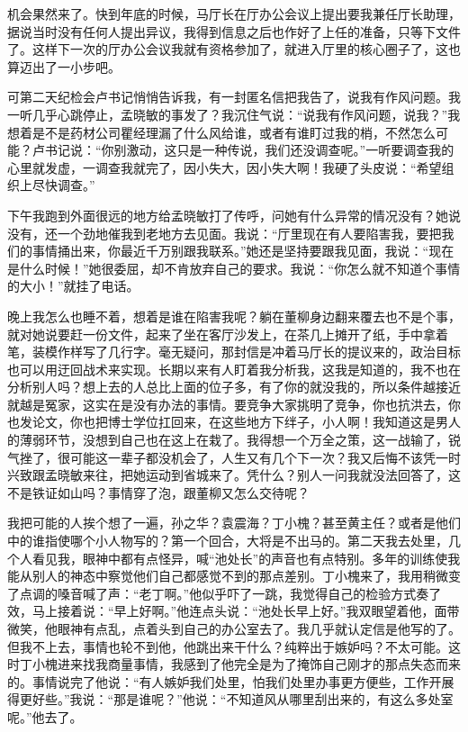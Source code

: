 \documentclass[12pt,oneside]{book}
\begin{document}
机会果然来了。快到年底的时候，马厅长在厅办公会议上提出要我兼任厅长助理，据说当时没有任何人提出异议，我得到信息之后也作好了上任的准备，只等下文件了。这样下一次的厅办公会议我就有资格参加了，就进入厅里的核心圈子了，这也算迈出了一小步吧。

可第二天纪检会卢书记悄悄告诉我，有一封匿名信把我告了，说我有作风问题。我一听几乎心跳停止，孟晓敏的事发了？我沉住气说：``说我有作风问题，说我？''我想着是不是药材公司瞿经理漏了什么风给谁，或者有谁盯过我的梢，不然怎么可能？卢书记说：``你别激动，这只是一种传说，我们还没调查呢。''一听要调查我的心里就发虚，一调查我就完了，因小失大，因小失大啊！我硬了头皮说：``希望组织上尽快调查。''

下午我跑到外面很远的地方给孟晓敏打了传呼，问她有什么异常的情况没有？她说没有，还一个劲地催我到老地方去见面。我说：``厅里现在有人要陷害我，要把我们的事情捅出来，你最近千万别跟我联系。''她还是坚持要跟我见面，我说：``现在是什么时候！''她很委屈，却不肯放弃自己的要求。我说：``你怎么就不知道个事情的大小！''就挂了电话。

晚上我怎么也睡不着，想着是谁在陷害我呢？躺在董柳身边翻来覆去也不是个事，就对她说要赶一份文件，起来了坐在客厅沙发上，在茶几上摊开了纸，手中拿着笔，装模作样写了几行字。毫无疑问，那封信是冲着马厅长的提议来的，政治目标也可以用迂回战术来实现。长期以来有人盯着我分析我，这我是知道的，我不也在分析别人吗？想上去的人总比上面的位子多，有了你的就没我的，所以条件越接近就越是冤家，这实在是没有办法的事情。要竞争大家挑明了竞争，你也抗洪去，你也发论文，你也把博士学位扛回来，在这些地方下绊子，小人啊！我知道这是男人的薄弱环节，没想到自己也在这上在栽了。我得想一个万全之策，这一战输了，锐气挫了，很可能这一辈子都没机会了，人生又有几个下一次？我又后悔不该凭一时兴致跟孟晓敏来往，把她运动到省城来了。凭什么？别人一问我就没法回答了，这不是铁证如山吗？事情穿了泡，跟董柳又怎么交待呢？

我把可能的人挨个想了一遍，孙之华？袁震海？丁小槐？甚至黄主任？或者是他们中的谁指使哪个小人物写的？第一个回合，大将是不出马的。第二天我去处里，几个人看见我，眼神中都有点怪异，喊``池处长''的声音也有点特别。多年的训练使我能从别人的神态中察觉他们自己都感觉不到的那点差别。丁小槐来了，我用稍微变了点调的嗓音喊了声：``老丁啊。''他似乎吓了一跳，我觉得自己的检验方式奏了效，马上接着说：``早上好啊。''他连点头说：``池处长早上好。''我双眼望着他，面带微笑，他眼神有点乱，点着头到自己的办公室去了。我几乎就认定信是他写的了。但我不上去，事情也轮不到他，他跳出来干什么？纯粹出于嫉妒吗？不太可能。这时丁小槐进来找我商量事情，我感到了他完全是为了掩饰自己刚才的那点失态而来的。事情说完了他说：``有人嫉妒我们处里，怕我们处里办事更方便些，工作开展得更好些。''我说：``那是谁呢？''他说：``不知道风从哪里刮出来的，有这么多处室呢。''他去了。
\end{document}
